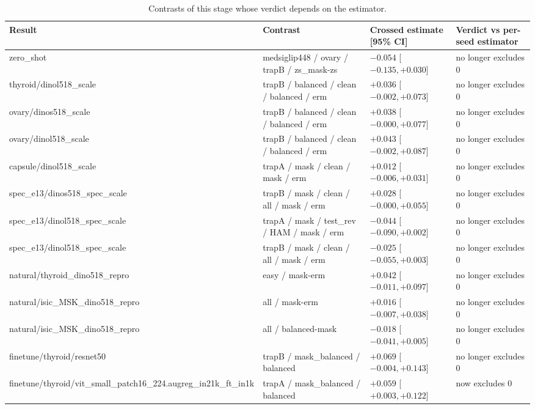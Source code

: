 \begin{table}[H]\centering\scriptsize
\caption{Contrasts of this stage whose verdict depends on the estimator.}\label{tab:estchanges}
\begin{tabular}{p{4.2cm}p{5.2cm}p{3.3cm}p{2.6cm}}\toprule
Result & Contrast & Crossed estimate [95\% CI] & Verdict vs per-seed estimator \\\midrule
zero\_shot & medsiglip448 /\allowbreak{} ovary /\allowbreak{} trapB /\allowbreak{} zs\_mask-zs & $-0.054$ [$-0.135, +0.030$] & no longer excludes 0 \\
thyroid/\allowbreak{}dinol518\_scale & trapB /\allowbreak{} balanced /\allowbreak{} clean /\allowbreak{} balanced /\allowbreak{} erm & $+0.036$ [$-0.002, +0.073$] & no longer excludes 0 \\
ovary/\allowbreak{}dinos518\_scale & trapB /\allowbreak{} balanced /\allowbreak{} clean /\allowbreak{} balanced /\allowbreak{} erm & $+0.038$ [$-0.000, +0.077$] & no longer excludes 0 \\
ovary/\allowbreak{}dinol518\_scale & trapB /\allowbreak{} balanced /\allowbreak{} clean /\allowbreak{} balanced /\allowbreak{} erm & $+0.043$ [$-0.002, +0.087$] & no longer excludes 0 \\
capsule/\allowbreak{}dinol518\_scale & trapA /\allowbreak{} mask /\allowbreak{} clean /\allowbreak{} mask /\allowbreak{} erm & $+0.012$ [$-0.006, +0.031$] & no longer excludes 0 \\
spec\_e13/\allowbreak{}dinos518\_spec\_scale & trapB /\allowbreak{} mask /\allowbreak{} clean /\allowbreak{} all /\allowbreak{} mask /\allowbreak{} erm & $+0.028$ [$-0.000, +0.055$] & no longer excludes 0 \\
spec\_e13/\allowbreak{}dinol518\_spec\_scale & trapA /\allowbreak{} mask /\allowbreak{} test\_rev /\allowbreak{} HAM /\allowbreak{} mask /\allowbreak{} erm & $-0.044$ [$-0.090, +0.002$] & no longer excludes 0 \\
spec\_e13/\allowbreak{}dinol518\_spec\_scale & trapB /\allowbreak{} mask /\allowbreak{} clean /\allowbreak{} all /\allowbreak{} mask /\allowbreak{} erm & $-0.025$ [$-0.055, +0.003$] & no longer excludes 0 \\
natural/\allowbreak{}thyroid\_dino518\_repro & easy  /\allowbreak{}  mask-erm & $+0.042$ [$-0.011, +0.097$] & no longer excludes 0 \\
natural/\allowbreak{}isic\_MSK\_dino518\_repro & all  /\allowbreak{}  mask-erm & $+0.016$ [$-0.007, +0.038$] & no longer excludes 0 \\
natural/\allowbreak{}isic\_MSK\_dino518\_repro & all  /\allowbreak{}  balanced-mask & $-0.018$ [$-0.041, +0.005$] & no longer excludes 0 \\
finetune/\allowbreak{}thyroid/\allowbreak{}resnet50 & trapB /\allowbreak{} mask\_balanced /\allowbreak{} balanced & $+0.069$ [$-0.004, +0.143$] & no longer excludes 0 \\
finetune/\allowbreak{}thyroid/\allowbreak{}vit\_small\_patch16\_224.augreg\_in21k\_ft\_in1k & trapA /\allowbreak{} mask\_balanced /\allowbreak{} balanced & $+0.059$ [$+0.003, +0.122$] & now excludes 0 \\
\bottomrule\end{tabular}
\end{table}
